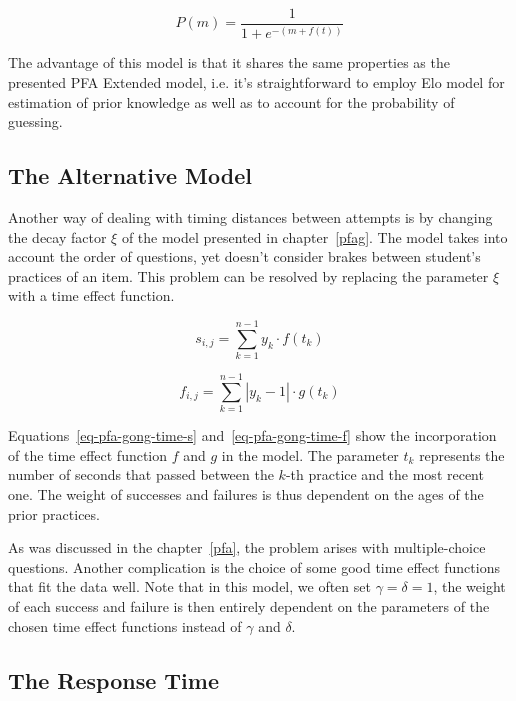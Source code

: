 \begin{equation} \label{eq-pfa-standard-time-p}
  P(m) = \frac{1}{1 + e^{-(m + f(t))}}
\end{equation}

The advantage of this model is that it shares the same properties as the presented PFA Extended model, i.e. it's straightforward to employ Elo model for estimation of prior knowledge as well as to account for the probability of guessing.

\subsection{The Alternative Model}
\label{pfagt}

Another way of dealing with timing distances between attempts is by changing the decay factor $\xi$ of the model presented in chapter~\ref{pfag}. The model takes into account the order of questions, yet doesn't consider brakes between student's practices of an item. This problem can be resolved by replacing the parameter $\xi$ with a time effect function.

\begin{equation} \label{eq-pfa-gong-time-s}
  s_{i,j} = \sum_{k=1}^{n-1} y_k \cdot f(t_k)
\end{equation}

\begin{equation} \label{eq-pfa-gong-time-f}
  f_{i,j} = \sum_{k=1}^{n-1} |y_k - 1| \cdot g(t_k)
\end{equation}

Equations~\ref{eq-pfa-gong-time-s} and~\ref{eq-pfa-gong-time-f} show the incorporation of the time effect function $f$ and $g$ in the model. The parameter $t_k$ represents the number of seconds that passed between the $k$-th practice and the most recent one. The weight of successes and failures is thus dependent on the ages of the prior practices.

As was discussed in the chapter~\ref{pfa}, the problem arises with multiple-choice questions. Another complication is the choice of some good time effect functions that fit the data well. Note that in this model, we often set $\gamma = \delta = 1$, the weight of each success and failure is then entirely dependent on the parameters of the chosen time effect functions instead of $\gamma$ and $\delta$.

\subsection{The Response Time}
\label{pfart}

